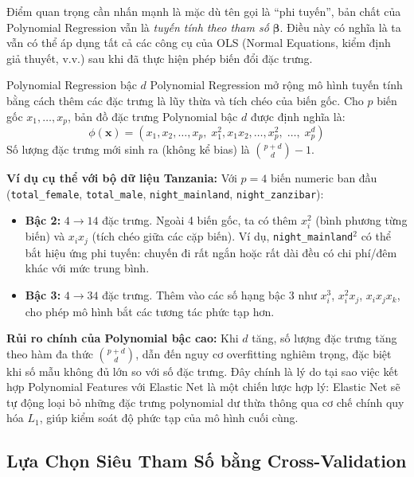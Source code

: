 \documentclass[12pt,a4paper]{article}
\begin{document}
Điểm quan trọng cần nhấn mạnh là mặc dù tên gọi là ``phi tuyến'', bản chất của Polynomial Regression vẫn là \textit{tuyến tính theo tham số} $\boldsymbol{\beta}$. Điều này có nghĩa là ta vẫn có thể áp dụng tất cả các công cụ của OLS (Normal Equations, kiểm định giả thuyết, v.v.) sau khi đã thực hiện phép biến đổi đặc trưng.

\begin{definitionbox}{Polynomial Regression bậc $d$}
Polynomial Regression mở rộng mô hình tuyến tính bằng cách thêm các đặc trưng là lũy thừa và tích chéo của biến gốc. Cho $p$ biến gốc $x_1, \ldots, x_p$, bản đồ đặc trưng Polynomial bậc $d$ được định nghĩa là:
\begin{equation}
\phi(\mathbf{x}) = \left(x_1, x_2, \ldots, x_p,\; x_1^2, x_1 x_2, \ldots, x_p^2,\; \ldots,\; x_p^d\right)
\end{equation}
Số lượng đặc trưng mới sinh ra (không kể bias) là $\binom{p+d}{d} - 1$.
\end{definitionbox}

\textbf{Ví dụ cụ thể với bộ dữ liệu Tanzania:} Với $p = 4$ biến numeric ban đầu (\texttt{total\_female}, \texttt{total\_male}, \texttt{night\_mainland}, \texttt{night\_zanzibar}):
\begin{itemize}[leftmargin=1.5em]
    \item \textbf{Bậc 2:} $4 \rightarrow 14$ đặc trưng. Ngoài 4 biến gốc, ta có thêm $x_i^2$ (bình phương từng biến) và $x_i x_j$ (tích chéo giữa các cặp biến). Ví dụ, \texttt{night\_mainland}$^2$ có thể bắt hiệu ứng phi tuyến: chuyến đi rất ngắn hoặc rất dài đều có chi phí/đêm khác với mức trung bình.
    \item \textbf{Bậc 3:} $4 \rightarrow 34$ đặc trưng. Thêm vào các số hạng bậc 3 như $x_i^3$, $x_i^2 x_j$, $x_i x_j x_k$, cho phép mô hình bắt các tương tác phức tạp hơn.
\end{itemize}

\begin{notebox}
\textbf{Rủi ro chính của Polynomial bậc cao:} Khi $d$ tăng, số lượng đặc trưng tăng theo hàm đa thức $\binom{p+d}{d}$, dẫn đến nguy cơ overfitting nghiêm trọng, đặc biệt khi số mẫu không đủ lớn so với số đặc trưng. Đây chính là lý do tại sao việc kết hợp Polynomial Features với Elastic Net là một chiến lược hợp lý: Elastic Net sẽ tự động loại bỏ những đặc trưng polynomial dư thừa thông qua cơ chế chính quy hóa $L_1$, giúp kiểm soát độ phức tạp của mô hình cuối cùng.
\end{notebox}

\subsection{Lựa Chọn Siêu Tham Số bằng Cross-Validation}
\end{document}

